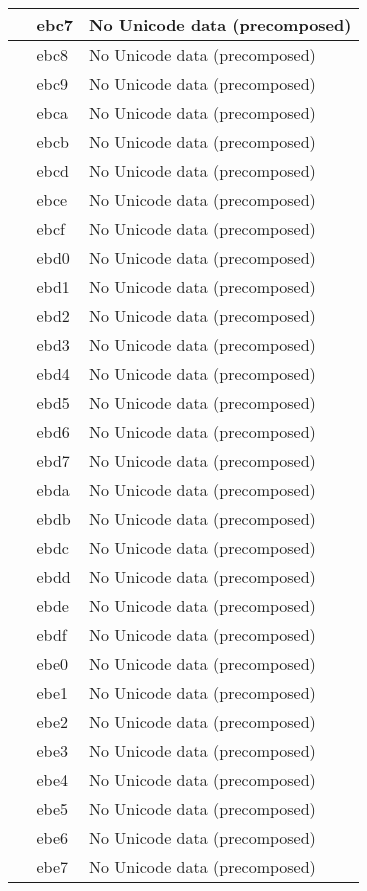 \documentclass[12pt,letterpaper,openany]{book}
\begin{document}
\begin{center}
\begin{supertabular}{|m{0.25in}|m{0.5in}|m{4in}|}
 & ebc7 & No Unicode data (precomposed)\\\hline
 & ebc8 & No Unicode data (precomposed)\\\hline
 & ebc9 & No Unicode data (precomposed)\\\hline
 & ebca & No Unicode data (precomposed)\\\hline
 & ebcb & No Unicode data (precomposed)\\\hline
 & ebcd & No Unicode data (precomposed)\\\hline
 & ebce & No Unicode data (precomposed)\\\hline
 & ebcf & No Unicode data (precomposed)\\\hline
 & ebd0 & No Unicode data (precomposed)\\\hline
 & ebd1 & No Unicode data (precomposed)\\\hline
 & ebd2 & No Unicode data (precomposed)\\\hline
 & ebd3 & No Unicode data (precomposed)\\\hline
 & ebd4 & No Unicode data (precomposed)\\\hline
 & ebd5 & No Unicode data (precomposed)\\\hline
 & ebd6 & No Unicode data (precomposed)\\\hline
 & ebd7 & No Unicode data (precomposed)\\\hline
 & ebda & No Unicode data (precomposed)\\\hline
 & ebdb & No Unicode data (precomposed)\\\hline
 & ebdc & No Unicode data (precomposed)\\\hline
 & ebdd & No Unicode data (precomposed)\\\hline
 & ebde & No Unicode data (precomposed)\\\hline
 & ebdf & No Unicode data (precomposed)\\\hline
 & ebe0 & No Unicode data (precomposed)\\\hline
 & ebe1 & No Unicode data (precomposed)\\\hline
 & ebe2 & No Unicode data (precomposed)\\\hline
 & ebe3 & No Unicode data (precomposed)\\\hline
 & ebe4 & No Unicode data (precomposed)\\\hline
 & ebe5 & No Unicode data (precomposed)\\\hline
 & ebe6 & No Unicode data (precomposed)\\\hline
 & ebe7 & No Unicode data (precomposed)\\\hline

\end{supertabular}
\end{center}
\end{document}
